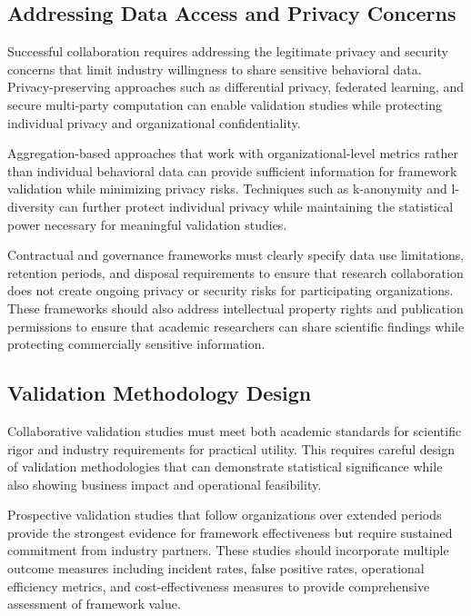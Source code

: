 \documentclass[10pt,twocolumn]{IEEEtran}
\begin{document}
\subsection{Addressing Data Access and Privacy Concerns}

Successful collaboration requires addressing the legitimate privacy and security concerns that limit industry willingness to share sensitive behavioral data. Privacy-preserving approaches such as differential privacy, federated learning, and secure multi-party computation can enable validation studies while protecting individual privacy and organizational confidentiality.

Aggregation-based approaches that work with organizational-level metrics rather than individual behavioral data can provide sufficient information for framework validation while minimizing privacy risks. Techniques such as k-anonymity and l-diversity can further protect individual privacy while maintaining the statistical power necessary for meaningful validation studies.

Contractual and governance frameworks must clearly specify data use limitations, retention periods, and disposal requirements to ensure that research collaboration does not create ongoing privacy or security risks for participating organizations. These frameworks should also address intellectual property rights and publication permissions to ensure that academic researchers can share scientific findings while protecting commercially sensitive information.

\subsection{Validation Methodology Design}

Collaborative validation studies must meet both academic standards for scientific rigor and industry requirements for practical utility. This requires careful design of validation methodologies that can demonstrate statistical significance while also showing business impact and operational feasibility.

Prospective validation studies that follow organizations over extended periods provide the strongest evidence for framework effectiveness but require sustained commitment from industry partners. These studies should incorporate multiple outcome measures including incident rates, false positive rates, operational efficiency metrics, and cost-effectiveness measures to provide comprehensive assessment of framework value.
\end{document}
